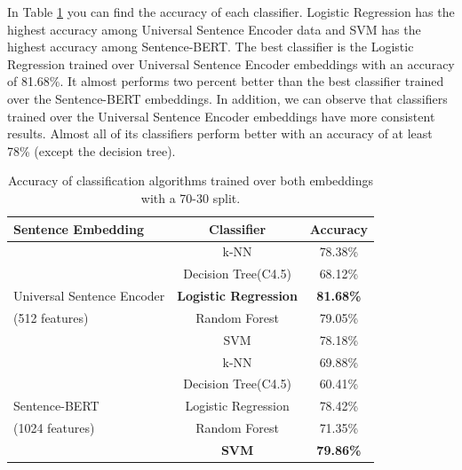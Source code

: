 \documentclass[conference]{IEEEtran}
\begin{document}
In Table \ref{tab:results} you can find the accuracy of each classifier. Logistic Regression has the 
highest accuracy among Universal Sentence Encoder data and SVM has the highest accuracy among 
Sentence-BERT. The best classifier is the Logistic Regression trained over Universal Sentence Encoder 
embeddings with an accuracy of 81.68\%. It almost performs two percent better than the best classifier 
trained over the Sentence-BERT embeddings. In addition, we can observe that classifiers trained over 
the Universal Sentence Encoder embeddings have more consistent results. Almost all of its classifiers  
perform better with an accuracy of at least 78\% (except the decision tree).

\begin{table}[t]
  \caption{Accuracy of classification algorithms trained over both embeddings with a 70-30 split.}
  \begin{center}
  \begin{tabular}{|l|c|c|}
  \hline
  \textbf{Sentence Embedding} & \textbf{Classifier}&\textbf{Accuracy}\\
  \hline
                            &k-NN                & 78.38\% \\
                            &Decision Tree(C4.5) & 68.12\% \\
  Universal Sentence Encoder&\textbf{Logistic Regression} & \textbf{81.68\%} \\
  (512 features)            &Random Forest       & 79.05\% \\
                            &SVM                 & 78.18\% \\
  \hline
               &k-NN                & 69.88\% \\
               &Decision Tree(C4.5) & 60.41\% \\
  Sentence-BERT&Logistic Regression & 78.42\% \\
  (1024 features)&Random Forest     & 71.35\% \\
               &\textbf{SVM}        & \textbf{79.86\%}\\
\hline
  \end{tabular}
  \end{center}
  \label{tab:results}
\end{table}
\end{document}
